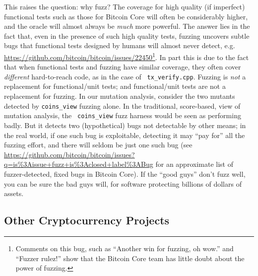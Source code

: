 This raises the question:  why fuzz?  The coverage for high quality
(if imperfect) functional tests such as those for Bitcoin Core will
often be considerably
higher, and the oracle will almost always be \emph{much} more powerful.  The answer lies in the
fact that, even in the presence of such high quality tests, fuzzing
uncovers subtle bugs that functional tests designed by humans will
almost never detect,
e.g. \url{https://github.com/bitcoin/bitcoin/issues/22450}\footnote{Comments
  on this bug, such as ``Another win for fuzzing, oh wow.'' and
  ``Fuzzer rulez!'' show that the Bitcoin Core team has little doubt
  about the power of fuzzing.}.  In part this is due to the fact that
when functional tests and fuzzing have similar coverage, they often
cover \emph{different} hard-to-reach code, as in the case of {\tt
  tx\_verify.cpp}.  Fuzzing is \emph{not} a replacement
for functional/unit tests; and functional/unit tests are not a
replacement for fuzzing.  In our mutation analysis, consider the two
mutants detected by {\tt coins\_view} fuzzing alone.  In the
traditional, score-based, view of mutation analysis, the {\tt
  coins\_view} fuzz harness would be seen as performing badly.  But it
detects two (hypothetical) bugs not detectable by other means; in the
real world, if one such bug is exploitable, detecting it may ``pay
for'' all the fuzzing effort, and there will seldom be just one such
bug (see
\url{https://github.com/bitcoin/bitcoin/issues?q=is\%3Aissue+fuzz+is\%3Aclosed+label\%3ABug}
for an approximate list of fuzzer-detected, fixed bugs in Bitcoin
Core).  If the ``good guys'' don't fuzz well, you can be sure the bad
guys will, for software protecting billions of dollars of assets.

\subsection{Other Cryptocurrency Projects}

